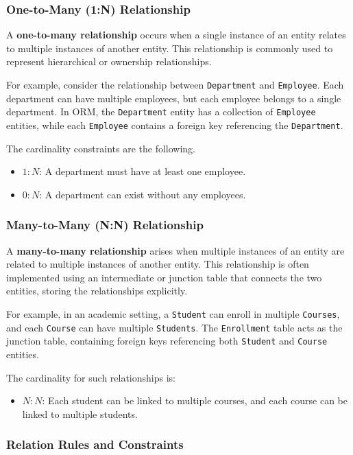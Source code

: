 \subsubsection{One-to-Many (1:N) Relationship} A \textbf{one-to-many relationship} occurs when a single instance of an entity relates to multiple instances of another entity. This relationship is commonly used to represent hierarchical or ownership relationships.

For example, consider the relationship between \texttt{Department} and \texttt{Employee}. Each department can have multiple employees, but each employee belongs to a single department. In ORM, the \texttt{Department} entity has a collection of \texttt{Employee} entities, while each \texttt{Employee} contains a foreign key referencing the \texttt{Department}.

The cardinality constraints are the following.
\begin{itemize}
    \item \(1:N\): A department must have at least one employee.
    \item \(0:N\): A department can exist without any employees.
\end{itemize}

\subsubsection{Many-to-Many (N:N) Relationship} A \textbf{many-to-many relationship} arises when multiple instances of an entity are related to multiple instances of another entity. This relationship is often implemented using an intermediate or junction table that connects the two entities, storing the relationships explicitly.

For example, in an academic setting, a \texttt{Student} can enroll in multiple \texttt{Courses}, and each \texttt{Course} can have multiple \texttt{Students}. The \texttt{Enrollment} table acts as the junction table, containing foreign keys referencing both \texttt{Student} and \texttt{Course} entities.

The cardinality for such relationships is:
\begin{itemize}
    \item \(N:N\): Each student can be linked to multiple courses, and each course can be linked to multiple students.
\end{itemize}

\subsubsection{Relation Rules and Constraints}

